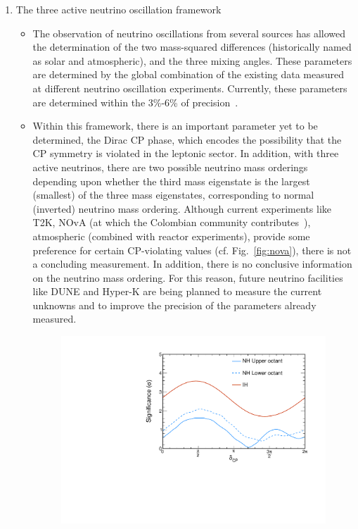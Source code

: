 \documentclass[a4paper,11pt]{article}
\begin{document}
\begin{enumerate}
    \item The three active neutrino oscillation framework
    \begin{itemize}
        \item The observation of neutrino oscillations from several sources has allowed the determination of the two mass-squared differences (historically named as solar and atmospheric), and the three mixing angles. These parameters are determined by the global combination of the existing data measured at different neutrino oscillation experiments. Currently, these parameters are determined within the 3\%-6\% of precision~\cite{deSalas:2020pgw}.
        \item Within this framework, there is an important parameter yet to be determined, the Dirac CP phase, which encodes the possibility that the CP symmetry is violated in the leptonic sector. In addition, with three active neutrinos, there are two possible neutrino mass orderings depending upon whether the third mass eigenstate is the largest (smallest) of the three mass eigenstates, corresponding to normal (inverted) neutrino mass ordering. Although current experiments like T2K, NOvA (at which the Colombian community contributes~\cite{NOvA:2018gge,Acero:2018kyq,Acero:2019ksn}), atmospheric  (combined with reactor experiments), provide some preference for certain CP-violating values (cf. Fig.~\ref{fig:nova}), there is not a concluding measurement. In addition, there is no conclusive information on the neutrino mass ordering. For this reason, future neutrino facilities like DUNE and Hyper-K are being planned to measure the current unknowns and to improve the precision of the parameters already measured. 
        \begin{figure}
	    \centering
	    \includegraphics[scale=0.4]{plots/slice_delta_3curves.pdf}

\end{figure}
\end{itemize}
\end{enumerate}
\end{document}

